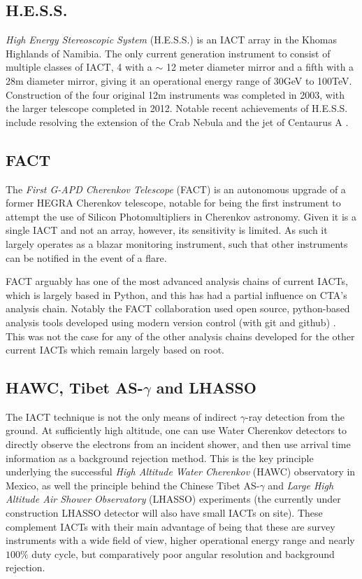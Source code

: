 \subsection{H.E.S.S.}
\textit{High Energy Stereoscopic System} (H.E.S.S.) is an IACT array in the Khomas Highlands of Namibia. The only current generation instrument to consist of multiple classes of IACT, 4 with a $\sim$ 12 meter diameter mirror and a fifth with a 28m diameter mirror, giving it an operational energy range of 30GeV to 100TeV. Construction of the four original 12m instruments was completed in 2003, with the larger telescope completed in 2012. Notable recent achievements of H.E.S.S. include resolving the extension of the Crab Nebula \cite{crabextension} and the jet of Centaurus A \cite{cena}.

\subsection{FACT}
The \textit{First G-APD Cherenkov Telescope} (FACT) is an autonomous upgrade of a former HEGRA Cherenkov telescope, notable for being the first instrument to attempt the use of Silicon Photomultipliers in Cherenkov astronomy. Given it is a single IACT and not an array, however, its sensitivity is limited. As such it largely operates as a blazar monitoring instrument, such that other instruments can be notified in the event of a flare. 

FACT arguably has one of the most advanced analysis chains of current IACTs, which is largely based in Python, and this has had a partial influence on CTA's analysis chain. Notably the FACT collaboration used open source, python-based analysis tools developed using modern version control (with git and github) \cite{factspec}. This was not the case for any of the other analysis chains developed for the other current IACTs which remain largely based on root.

\subsection{HAWC, Tibet AS-$\gamma$ and LHASSO}

The IACT technique is not the only means of indirect $\gamma$-ray detection from the ground. At sufficiently high altitude, one can use Water Cherenkov detectors to directly observe the electrons from an incident shower, and then use arrival time information as a background rejection method. This is the key principle underlying the successful \textit{High Altitude Water Cherenkov} (HAWC) observatory in Mexico, as well the principle behind the Chinese Tibet AS-$\gamma$ and \textit{Large High Altitude Air Shower Observatory} (LHASSO) experiments (the currently under construction LHASSO detector will also have small IACTs on site). These complement IACTs with their main advantage of being that these are survey instruments with a wide field of view, higher operational energy range and nearly $100\%$ duty cycle, but comparatively poor angular resolution and background rejection. 

